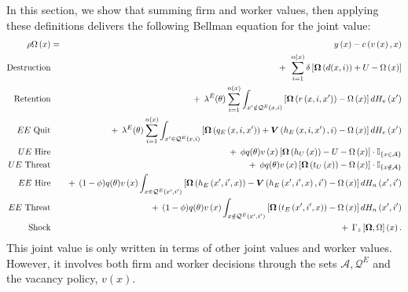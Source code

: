 In this section, we show that summing firm and worker
values, then applying these definitions delivers the following Bellman
equation for the joint value:
\begin{eqnarray}
\rho \Omega \left( x\right) &=&y\left( x\right) -c\left( v\left( x\right)
,x\right)  \label{eq:D_omega1} \\
\text{Destruction} &&+\:\:\sum\limits_{i=1}^{n\left( x\right) }\delta \left[
\bm{\Omega }\left( d(x,i)\right) +U-\Omega \left( x\right) \right]
\notag \\
\text{Retention} &&+\:\:\lambda^E(\theta)\sum\limits_{i=1}^{n\left( x\right)
}\int_{x^{\prime }\notin \mathcal{Q}^{E}\left( x,i\right) }\left[ \bm{%
\Omega }\left( r\left( x,i,x^{\prime }\right) \right) -\Omega \left(
x\right) \right] dH_v\left( x^{\prime }\right)  \notag \\
\text{$EE$ Quit} &&+\:\:\lambda^E(\theta)\sum\limits_{i=1}^{n\left( x\right)
}\int_{x^{\prime }\in \mathcal{Q}^{E}\left( x,i\right) }\left[ \bm{%
\Omega }\left( q_{E}\left( x,i,x^{\prime }\right) \right) +\bm{V}\left(
h_{E}\left( x,i,x^{\prime }\right) ,i\right) -\Omega \left( x\right) \right]
dH_v\left( x^{\prime }\right)  \notag \\
\text{$UE$ Hire} &&+\:\:\phi q(\theta)v\left( x\right) \left[ \bm{\Omega
}\left( h_{U}\left( x\right) \right) -U-\Omega \left( x\right) \right] \cdot
\mathbb{I}_{\left\{ x\in \mathcal{A}\right\} }  \notag \\
\text{$UE$ Threat} &&+\:\:\phi q(\theta)v\left( x\right) \left[ \bm{%
\Omega }\left( t_{U}\left( x\right) \right) -\Omega \left( x\right) \right]
\cdot \mathbb{I}_{\left\{ x\notin \mathcal{A}\right\} }  \notag \\
\text{$EE$ Hire} &&+\:\:(1-\phi)q(\theta)v\left( x\right) \int_{x\in
\mathcal{Q}^{E}\left( x^{\prime },i^{\prime }\right) }\left[ \bm{\Omega }%
\left( h_{E}\left( x^{\prime },i^{\prime },x\right) \right) -\bm{V}%
\left( h_{E}\left( x^{\prime },i^{\prime },x\right) ,i^{\prime }\right)
-\Omega \left( x\right) \right] dH_n\left( x^{\prime },i^{\prime }\right)
\notag \\
\text{$EE$ Threat} &&+\:\:(1-\phi)q(\theta)v\left( x\right) \int_{x\notin
\mathcal{Q}^{E}\left( x^{\prime },i^{\prime }\right) }\left[ \bm{\Omega }%
\left( t_{E}\left( x^{\prime },i^{\prime },x\right) \right) -\Omega \left(
x\right) \right] dH_n\left( x^{\prime },i^{\prime }\right)  \notag \\
\text{Shock} &&+\:\:{\Gamma }_{z}\left[ \bm{\Omega },\Omega \right]
\left( x\right) .  \notag
\end{eqnarray}%
This joint value is only written in terms of other joint values
and worker values. However, it involves both firm and worker decisions
through the sets $\mathcal{A}, \mathcal{Q}^{E}$ and the vacancy policy, $v(x)$.

